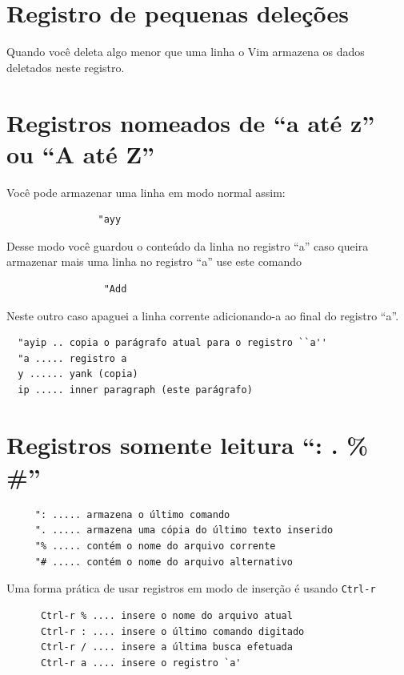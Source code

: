 \documentclass[10pt,a4paper,openany]{book}
\begin{document}
\section{Registro de pequenas deleções}
\label{Registro de pequenas deleções}
Quando você deleta algo menor que uma linha o Vim armazena os dados deletados neste registro.

\section{Registros nomeados de ``a até z'' ou ``A até Z''}
\label{Registros nomeados de ``a até z'' ou ``A até Z''}
Você pode armazenar uma linha em modo normal assim:

\begin{verbatim}
				"ayy
\end{verbatim}

Desse modo você guardou o conteúdo da linha no registro ``a'' caso
queira armazenar mais uma linha no registro ``a'' use este comando

\begin{verbatim}
				 "Add
\end{verbatim}

Neste outro caso apaguei a linha corrente adicionando-a ao final do registro ``a''.

\begin{verbatim}
  "ayip .. copia o parágrafo atual para o registro ``a''
  "a ..... registro a
  y ...... yank (copia)
  ip ..... inner paragraph (este parágrafo)
\end{verbatim}

\section{Registros somente leitura ``: . \% \#''}
\label{Registros somente leitura}

\begin{verbatim}
	 ": ..... armazena o último comando
	 ". ..... armazena uma cópia do último texto inserido
	 "% ..... contém o nome do arquivo corrente
	 "# ..... contém o nome do arquivo alternativo
\end{verbatim}

Uma forma prática de usar registros em modo de inserção é usando
\verb|Ctrl-r|


\begin{verbatim}
	  Ctrl-r % .... insere o nome do arquivo atual
	  Ctrl-r : .... insere o último comando digitado
	  Ctrl-r / .... insere a última busca efetuada
	  Ctrl-r a .... insere o registro `a'
\end{verbatim}
\end{document}
